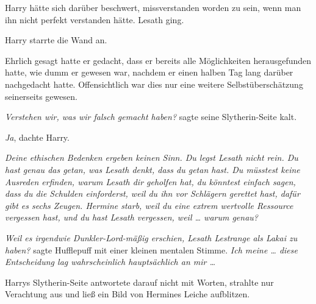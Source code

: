
Harry hätte sich darüber beschwert, missverstanden worden zu sein, wenn man ihn nicht perfekt verstanden hätte. Lesath ging.

Harry starrte die Wand an.

Ehrlich gesagt hatte er gedacht, dass er bereits alle Möglichkeiten herausgefunden hatte, wie dumm er gewesen war, nachdem er einen halben Tag lang darüber nachgedacht hatte.
Offensichtlich war dies nur eine weitere Selbstüberschätzung seinerseits gewesen.

\emph{Verstehen wir, was wir falsch gemacht haben?} sagte seine Slytherin-Seite kalt.

\emph{Ja}, dachte Harry.

\emph{Deine ethischen Bedenken ergeben keinen Sinn. Du legst Lesath nicht rein. Du hast genau das getan, was Lesath denkt, dass du getan hast. Du müsstest keine Ausreden erfinden, warum Lesath dir geholfen hat, du könntest einfach sagen, dass du die Schulden einforderst, weil du ihn vor Schlägern gerettet hast, dafür gibt es sechs Zeugen. Hermine starb, weil du eine extrem wertvolle Ressource vergessen hast, und du hast Lesath vergessen, weil … warum genau?}

\emph{Weil es irgendwie Dunkler-Lord-mäßig erschien, Lesath Lestrange als Lakai zu haben?} sagte Hufflepuff mit einer kleinen mentalen Stimme. \emph{Ich meine … diese Entscheidung lag wahrscheinlich hauptsächlich an mir …}

Harrys Slytherin-Seite antwortete darauf nicht mit Worten, strahlte nur Verachtung aus und ließ ein Bild von Hermines Leiche aufblitzen.

